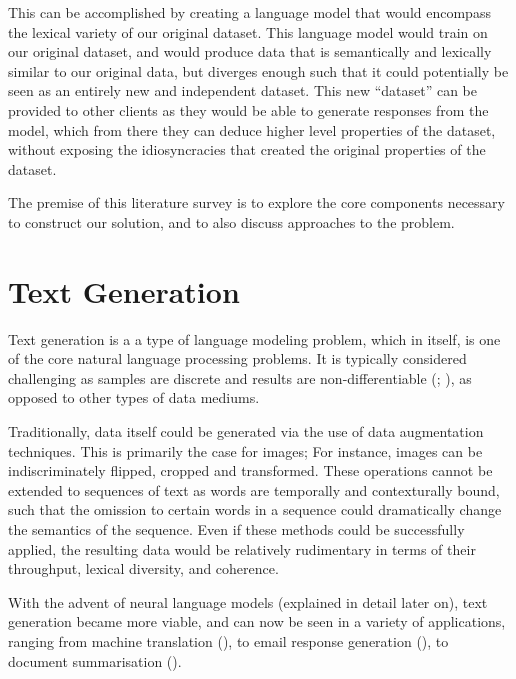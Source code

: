 \documentclass[12pt,twoside]{report}
\begin{document}
This can be accomplished by creating a language model that would encompass the lexical variety of our original dataset. This language model would train on our original dataset, and would produce data that is semantically and lexically similar to our original data, but diverges enough such that it could potentially be seen as an entirely new and independent dataset. This new ``dataset'' can be provided to other clients as they would be able to generate responses from the model, which from there they can deduce higher level properties of the dataset, without exposing the idiosyncracies that created the original properties of the dataset.

The premise of this literature survey is to explore the core components necessary to construct our solution, and to also discuss approaches to the problem.

\section{Text Generation}


Text generation is a a type of language modeling problem, which in itself, is one of the core natural language processing problems. It is typically considered challenging as samples are discrete and results are non-differentiable (\cite{kovalenko_controllable_2017}; \cite{kovalenko_controllable_2017-1}), as opposed to other types of data mediums. 

Traditionally, data itself could be generated via the use of data augmentation techniques. This is primarily the case for images; For instance, images can be indiscriminately flipped, cropped and transformed. These operations cannot be extended to sequences of text as words are temporally and contexturally bound, such that the omission to certain words in a sequence could dramatically change the semantics of the sequence. Even if these methods could be successfully applied, the resulting data would be relatively rudimentary in terms of their throughput, lexical diversity, and coherence.

With the advent of neural language models (explained in detail later on), text generation became more viable, and can now be seen in a variety of applications, ranging from machine translation (\cite{sutskever_sequence_2014}), to email response generation (\cite{kannan_smart_2016}), to document summarisation (\cite{nallapati_summarunner_2016}).
\end{document}
